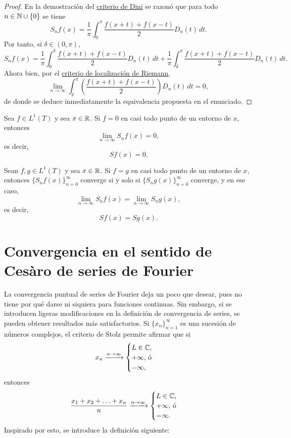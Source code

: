 \documentclass[a4paper, 11pt, oneside]{report}
\begin{document}
\begin{proof}
  En la demostración del \hyperref[teo:4.2.3]{\color{c1}criterio de Dini} se razonó que para todo $n \in \mathbb N \cup \{0\}$ se tiene
  \[S_nf(x) = \frac{1}{\pi}\int_0^\pi \frac{f(x+t)+f(x-t)}{2}D_n(t) \, dt.\]
  Por tanto, si $\delta \in (0,\pi)$,
  \[S_nf(x) = \frac{1}{\pi}\int_0^\delta \frac{f(x+t)+f(x-t)}{2}D_n(t) \, dt + \frac{1}{\pi}\int_\delta^\pi \frac{f(x+t)+f(x-t)}{2}D_n(t) \, dt.\]
  Ahora bien, por el \hyperref[teo:4.2.5]{\color{c1}criterio de localización de Riemann},
  \[\lim_{n \to \infty} \int_\delta^\pi \left(\frac{f(x+t)+f(x-t)}{2}\right)D_n(t) \, dt = 0,\]
  de donde se deduce inmediatamente la equivalencia propuesta en el enunciado.
\end{proof}

\begin{corollary}
  Sea $f \in L^1(T)$ y sea $x \in \mathbb R$. Si $f = 0$ en casi todo punto de un entorno de $x$, entonces
  \[\lim_{n \to \infty} S_nf(x) = 0,\]
  es decir,
  \[Sf(x) = 0.\]
\end{corollary}

\begin{corollary}
  Sean $f,g \in L^1(T)$ y sea $x \in \mathbb R$. Si $f = g$ en casi todo punto de un entorno de $x$, entonces $\{S_nf(x)\}_{n=0}^\infty$ converge si y solo si $\{S_ng(x)\}_{n=0}^\infty$ converge, y en ese caso,
  \[\lim_{n \to \infty} S_nf(x) = \lim_{n \to \infty} S_ng(x),\]
  es decir,
  \[Sf(x) = Sg(x).\]
\end{corollary}

\section{Convergencia en el sentido de Cesàro de series de Fourier}

La convergencia puntual de series de Fourier deja un poco que desear, pues no tiene por qué darse ni siquiera para funciones continuas. Sin embargo, si se introducen ligeras modificaciones en la definición de convergencia de series, se pueden obtener resultados más satisfactorios. Si $\{x_n\}_{n=1}^\infty$ es una sucesión de números complejos, el criterio de Stolz permite afirmar que si
\[x_n \xrightarrow{n \to \infty} \begin{cases}
  L \in \C, \\
  +\infty, $ ó $ \\
  -\infty,
\end{cases}\] 
entonces
\[\frac{x_1+x_2+\mathellipsis+x_n}{n} \xrightarrow{n \to \infty} \begin{cases}
  L \in \C, \\
  +\infty, $ ó $ \\
  -\infty.
\end{cases}\] 
Inspirado por esto, se introduce la definición siguiente:
\end{document}
